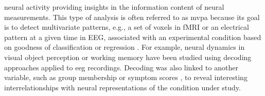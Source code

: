 neural activity providing insights in the information content of neural measurements. This type of analysis is often referred to as \gls{mvpa} because its goal is to detect multivariate patterns, e.g., a set of voxels in fMRI or an electrical pattern at a given time in EEG, associated with an experimental condition based on goodness of classification or regression \cite{Holdgraf2017}. For example, neural dynamics in visual object perception \cite{Cauchoix2014} or working memory \cite{Bae2018} have been studied using decoding approaches applied to \gls{eeg} recordings. Decoding was also linked to another variable, such as group membership \cite{Csizmadia2021, Bae2020} or symptom scores \cite{Coutanche2011} , to reveal interesting interrelationships with neural representations of the condition under study.\\



